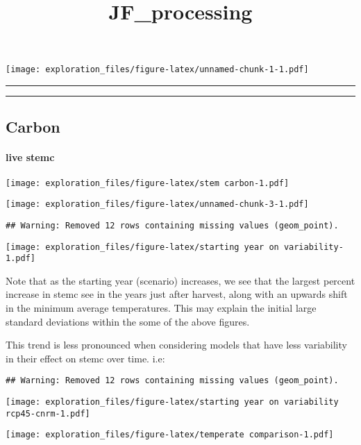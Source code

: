 \documentclass[]{article}
\title{JF\_processing}
\author{}
\date{}
\let\oldparagraph\paragraph
\renewcommand{\paragraph}[1]{\oldparagraph{#1}\mbox{}}
\begin{document}
\maketitle

\texttt{[image: exploration\_files/figure-latex/unnamed-chunk-1-1.pdf]}

\begin{center}\rule{0.5\linewidth}{\linethickness}\end{center}

\begin{center}\rule{0.5\linewidth}{\linethickness}\end{center}

\subsection{Carbon}\label{carbon}

\paragraph{live stemc}\label{live-stemc}

\texttt{[image: exploration\_files/figure-latex/stem carbon-1.pdf]}

\texttt{[image: exploration\_files/figure-latex/unnamed-chunk-3-1.pdf]}

\begin{verbatim}
## Warning: Removed 12 rows containing missing values (geom_point).
\end{verbatim}

\texttt{[image: exploration\_files/figure-latex/starting year on variability-1.pdf]}

Note that as the starting year (scenario) increases, we see that the
largest percent increase in stemc see in the years just after harvest,
along with an upwards shift in the minimum average temperatures. This
may explain the initial large standard deviations within the some of the
above figures.

This trend is less pronounced when considering models that have less
variability in their effect on stemc over time. i.e:

\begin{verbatim}
## Warning: Removed 12 rows containing missing values (geom_point).
\end{verbatim}

\texttt{[image: exploration\_files/figure-latex/starting year on variability rcp45-cnrm-1.pdf]}

\texttt{[image: exploration\_files/figure-latex/temperate comparison-1.pdf]}
\end{document}
